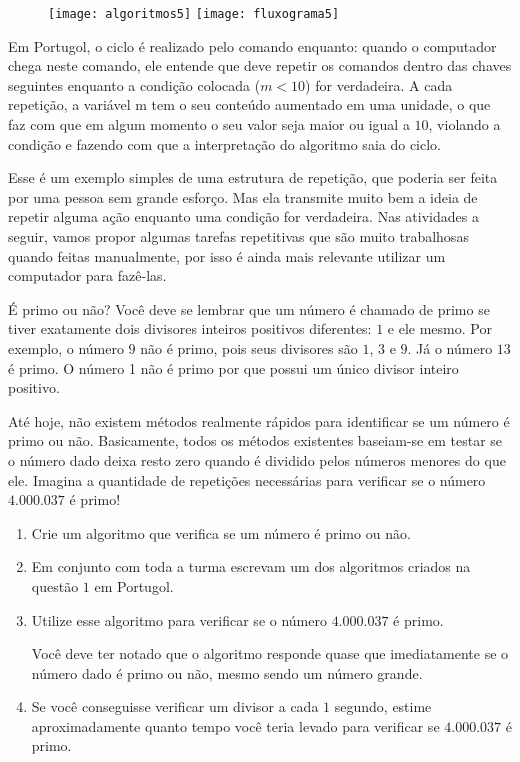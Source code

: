 \begin{figure}[H]
\centering

\texttt{[image: algoritmos5]}
\hspace{1em}
\texttt{[image: fluxograma5]}
\end{figure}

Em Portugol, o ciclo é realizado pelo comando enquanto: quando o computador chega neste comando, ele entende que deve repetir os comandos dentro das chaves seguintes enquanto a condição colocada ($m<10$) for verdadeira. A cada repetição, a variável m tem o seu conteúdo aumentado em uma unidade, o que faz com que em algum momento o seu valor seja maior ou igual a $10$, violando a condição e fazendo com que a interpretação do algoritmo saia do ciclo.

Esse é um exemplo simples de uma estrutura de repetição, que poderia ser feita por uma pessoa sem grande esforço. Mas ela transmite muito bem a ideia de repetir alguma ação enquanto uma condição for verdadeira. Nas atividades a seguir, vamos propor algumas tarefas repetitivas que são muito trabalhosas quando feitas manualmente, por isso é ainda mais relevante utilizar um computador para fazê-las.

\begin{task}{É primo ou não?}
Você deve se lembrar que um número é chamado de primo se tiver exatamente dois divisores inteiros positivos diferentes: $1$ e ele mesmo. Por exemplo, o número $9$ não é primo, pois seus divisores são $1$, $3$ e $9$. Já o número $13$ é primo. O número 1 não é primo por que possui um único divisor inteiro positivo.

Até hoje, não existem métodos realmente rápidos para identificar se um número é primo ou não. Basicamente, todos os métodos existentes baseiam-se em testar se o número dado deixa resto zero quando é dividido pelos números menores do que ele. Imagina a quantidade de repetições necessárias para verificar se o número $4.000.037$ é primo!

\begin{enumerate}
\item Crie um algoritmo que verifica se um número é primo ou não.

\item Em conjunto com toda a turma escrevam um dos algoritmos criados na questão $1$ em Portugol.

\item Utilize esse algoritmo para verificar se o número $4.000.037$ é primo.

Você deve ter notado que o algoritmo responde quase que imediatamente se o número dado é primo ou não, mesmo sendo um número grande.

\item Se você conseguisse verificar um divisor a cada $1$ segundo, estime aproximadamente quanto tempo você teria levado para verificar se $4.000.037$ é primo.
\end{enumerate}

\end{task}


